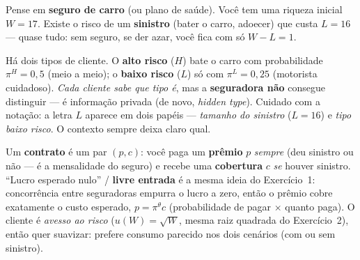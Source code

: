 \documentclass[11pt,a4paper]{article}
\newcommand{\dc}[2]{#1{,}#2}
\begin{document}
\begin{empalavras}
Pense em \textbf{seguro de carro} (ou plano de saúde). Você tem uma riqueza inicial $W =
17$. Existe o risco de um \textbf{sinistro} (bater o carro, adoecer) que custa $L = 16$ —
quase tudo: sem seguro, se der azar, você fica com só $W - L = 1$.

\smallskip\noindent
Há dois tipos de cliente. O \textbf{alto risco} ($H$) bate o carro com probabilidade
$\pi^H = \dc{0}{5}$ (meio a meio); o \textbf{baixo risco} ($L$) só com $\pi^L = \dc{0}{25}$
(motorista cuidadoso). \emph{Cada cliente sabe que tipo é}, mas a \textbf{seguradora não}
consegue distinguir — é informação privada (de novo, \emph{hidden type}). Cuidado com a
notação: a letra $L$ aparece em dois papéis — \emph{tamanho do sinistro} ($L = 16$) e
\emph{tipo baixo risco}. O contexto sempre deixa claro qual.

\smallskip\noindent
Um \textbf{contrato} é um par $(p, c)$: você paga um \textbf{prêmio} $p$ \emph{sempre} (deu
sinistro ou não — é a mensalidade do seguro) e recebe uma \textbf{cobertura} $c$ \emph{se}
houver sinistro. ``Lucro esperado nulo'' / \textbf{livre entrada} é a mesma ideia do
Exercício~1: concorrência entre seguradoras empurra o lucro a zero, então o prêmio cobre
exatamente o custo esperado, $p = \pi^\theta c$ (probabilidade de pagar $\times$ quanto paga).
O cliente é \emph{avesso ao risco} ($u(W) = \sqrt{W}$, mesma raiz quadrada do Exercício~2),
então quer suavizar: prefere consumo parecido nos dois cenários (com ou sem sinistro).
\end{empalavras}
\end{document}
